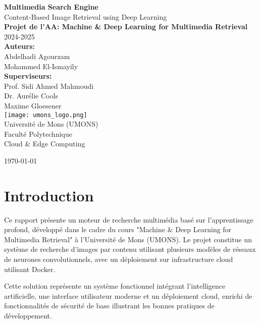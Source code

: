 \documentclass[12pt,a4paper]{article}
\begin{document}
\begin{titlepage}
    \centering
    \vspace*{2cm}
    
    {\Huge\bfseries Multimedia Search Engine}\\[0.5cm]
    {\LARGE Content-Based Image Retrieval using Deep Learning}\\[1.5cm]
    
    {\Large\bfseries Projet de l'AA: Machine \& Deep Learning for Multimedia Retrieval}\\[1cm]
    {\large 2024-2025}\\[2cm]
    
    {\Large\textbf{Auteurs:}}\\[0.5cm]
    {\large Abdelhadi Agourzam}\\
    {\large Mohammed El-Ismayily}\\[2cm]
    
    {\Large\textbf{Superviseurs:}}\\[0.5cm]
    {\large Prof. Sidi Ahmed Mahmoudi}\\
    {\large Dr. Aurélie Cools}\\
    {\large Maxime Gloesener}\\[2cm]
    
    \texttt{[image: umons\_logo.png]}\\[1cm]
    
    {\large Université de Mons (UMONS)}\\
    {\large Faculté Polytechnique}\\
    {\large Cloud \& Edge Computing}
    
    \vfill
    {\large \today}
\end{titlepage}

\tableofcontents
\newpage

\section{Introduction}

Ce rapport présente un moteur de recherche multimédia basé sur l'apprentissage profond, développé dans le cadre du cours "Machine \& Deep Learning for Multimedia Retrieval" à l'Université de Mons (UMONS). Le projet constitue un système de recherche d'images par contenu utilisant plusieurs modèles de réseaux de neurones convolutionnels, avec un déploiement sur infrastructure cloud utilisant Docker.

Cette solution représente un système fonctionnel intégrant l'intelligence artificielle, une interface utilisateur moderne et un déploiement cloud, enrichi de fonctionnalités de sécurité de base illustrant les bonnes pratiques de développement.
\end{document}
